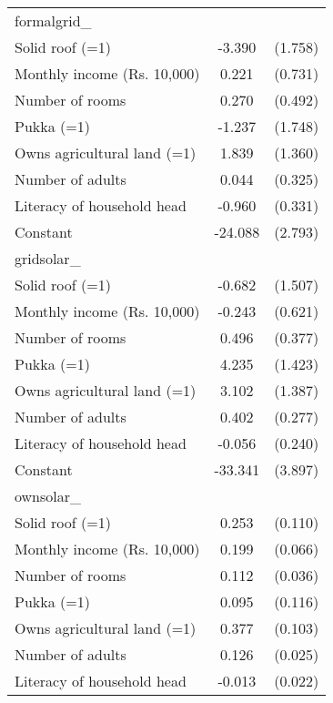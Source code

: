 \begin{table}[htbp]
{\begin{tabular}{l*{1}{cc}}
\midrule
formalgrid\_         &                     &            \\
Solid roof (=1)     &      -3.390\sym{*}  &     (1.758)\\
Monthly income (Rs. 10,000)&       0.221         &     (0.731)\\
Number of rooms     &       0.270         &     (0.492)\\
Pukka (=1)          &      -1.237         &     (1.748)\\
Owns agricultural land (=1)&       1.839         &     (1.360)\\
Number of adults    &       0.044         &     (0.325)\\
Literacy of household head&      -0.960\sym{***}&     (0.331)\\
Constant            &     -24.088\sym{***}&     (2.793)\\
\midrule
gridsolar\_          &                     &            \\
Solid roof (=1)     &      -0.682         &     (1.507)\\
Monthly income (Rs. 10,000)&      -0.243         &     (0.621)\\
Number of rooms     &       0.496         &     (0.377)\\
Pukka (=1)          &       4.235\sym{***}&     (1.423)\\
Owns agricultural land (=1)&       3.102\sym{**} &     (1.387)\\
Number of adults    &       0.402         &     (0.277)\\
Literacy of household head&      -0.056         &     (0.240)\\
Constant            &     -33.341\sym{***}&     (3.897)\\
\midrule
ownsolar\_           &                     &            \\
Solid roof (=1)     &       0.253\sym{**} &     (0.110)\\
Monthly income (Rs. 10,000)&       0.199\sym{***}&     (0.066)\\
Number of rooms     &       0.112\sym{***}&     (0.036)\\
Pukka (=1)          &       0.095         &     (0.116)\\
Owns agricultural land (=1)&       0.377\sym{***}&     (0.103)\\
Number of adults    &       0.126\sym{***}&     (0.025)\\
Literacy of household head&      -0.013         &     (0.022)\\

\end{tabular}}
\end{table}
